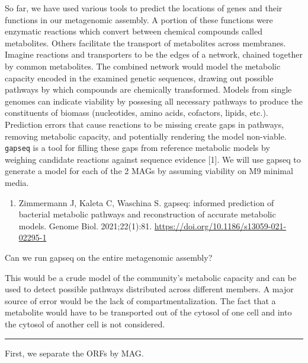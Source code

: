 \documentclass[
]{book}
\providecommand{\tightlist}{%
  \setlength{\itemsep}{0pt}\setlength{\parskip}{0pt}}
\begin{document}
So far, we have used various tools to predict the locations of genes and their functions in our metagenomic assembly.
A portion of these functions were enzymatic reactions which convert between chemical compounds called metabolites.
Others facilitate the transport of metabolites across membranes. Imagine reactions and transporters to be the edges of a network,
chained together by common metabolites. The combined network would model the metabolic capacity encoded in the examined genetic sequences,
drawing out possible pathways by which compounds are chemically transformed. Models from single genomes can indicate viability
by possesing all necessary pathways to produce the constituents of biomass (nucleotides, amino acids, cofactors, lipids, etc.).
Prediction errors that cause reactions to be missing create gaps in pathways, removing metabolic capacity, and potentially rendering
the model non-viable. \texttt{gapseq} is a tool for filling these gaps from reference metabolic models by weighing candidate reactions
against sequence evidence {[}1{]}. We will use gapseq to generate a model for each of the 2 MAGs by assuming viability on M9 minimal media.

\begin{enumerate}
\def\labelenumi{\arabic{enumi}.}
\tightlist
\item
  Zimmermann J, Kaleta C, Waschina S. gapseq: informed prediction of bacterial metabolic pathways and reconstruction of accurate metabolic models. Genome Biol. 2021;22(1):81. \url{https://doi.org/10.1186/s13059-021-02295-1}
\end{enumerate}

Can we run gapseq on the entire metagenomic assembly?

This would be a crude model of the community's metabolic capacity and can be used to detect possible pathways distributed across
different members. A major source of error would be the lack of compartmentalization. The fact that a metabolite would have to be
transported out of the cytosol of one cell and into the cytosol of another cell is not considered.

\begin{center}\rule{0.5\linewidth}{0.5pt}\end{center}

First, we separate the ORFs by MAG.
\end{document}
